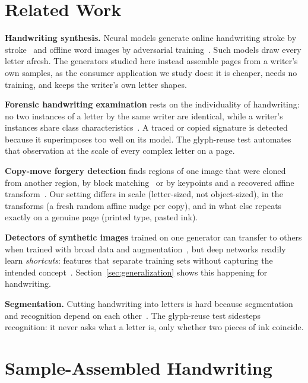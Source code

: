 \documentclass[conference]{IEEEtran}
\begin{document}
\section{Related Work}

\textbf{Handwriting synthesis.} Neural models generate online handwriting stroke by stroke~\cite{graves2013generating}
and offline word images by adversarial training~\cite{fogel2020scrabblegan}. Such models draw every letter afresh. The
generators studied here instead assemble pages from a writer's own samples, as the consumer application we study does:
it is cheaper, needs no training, and keeps the writer's own letter shapes.

\textbf{Forensic handwriting examination} rests on the individuality of handwriting: no two instances of a letter by
the same writer are identical, while a writer's instances share class characteristics~\cite{srihari2002individuality}.
A traced or copied signature is detected because it superimposes too well on its model. The glyph-reuse test automates
that observation at the scale of every complex letter on a page.

\textbf{Copy-move forgery detection} finds regions of one image that were cloned from another region, by block
matching~\cite{fridrich2003copymove} or by keypoints and a recovered affine transform~\cite{amerini2011sift}. Our setting
differs in scale (letter-sized, not object-sized), in the transforms (a fresh random affine nudge per copy), and in what
else repeats exactly on a genuine page (printed type, pasted ink).

\textbf{Detectors of synthetic images} trained on one generator can transfer to others when trained with broad data and
augmentation~\cite{wang2020cnngenerated}, but deep networks readily learn \emph{shortcuts}: features that separate
training sets without capturing the intended concept~\cite{geirhos2020shortcut}. Section~\ref{sec:generalization} shows
this happening for handwriting.

\textbf{Segmentation.} Cutting handwriting into letters is hard because segmentation and recognition depend on each
other~\cite{sayre1973}. The glyph-reuse test sidesteps recognition: it never asks what a letter is, only whether two
pieces of ink coincide.

\section{Sample-Assembled Handwriting}
\label{sec:generator}
\end{document}
